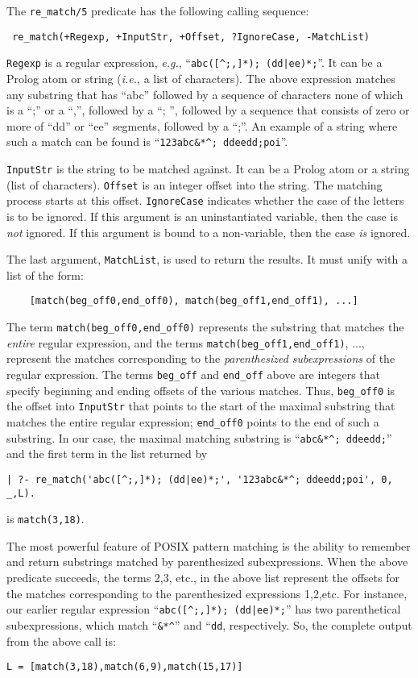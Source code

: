 The \verb|re_match/5| predicate has the following calling sequence:
\begin{verbatim}
 re_match(+Regexp, +InputStr, +Offset, ?IgnoreCase, -MatchList)
\end{verbatim}
{\tt Regexp} is a regular expression, {\it e.g.},
``\verb/abc([^;,]*); (dd|ee)*;/''. It can be a Prolog atom or string ({\it i.e.}, a list of
characters). The above expression matches any substring that has ``abc''
followed by a sequence of characters none of which is a ``;'' or a ``,'',
followed by a ``; '', followed by a sequence that consists of zero or more
of ``dd'' or ``ee'' segments, followed by a ``;''. An example of a string
where such a match can be found is ``\verb|123abc&*^; ddeedd;poi|''.

{\tt InputStr} is the string to be matched against. It can be a Prolog atom
or a string (list of characters). {\tt Offset} is an integer offset into
the string. The matching process starts at this offset. {\tt IgnoreCase}
indicates whether the case of the letters is to be ignored. If this
argument is an uninstantiated variable, then the case is \emph{not}
ignored. If this argument is bound to a non-variable, then the case
\emph{is} ignored.

The last argument, {\tt MatchList}, is used to return the results. It
must unify with a list of the form:
\begin{verbatim}
    [match(beg_off0,end_off0), match(beg_off1,end_off1), ...]  
\end{verbatim}
The term \verb|match(beg_off0,end_off0)| represents the substring
that matches the \emph{entire} regular expression,
and the terms \verb|match(beg_off1,end_off1)|, ..., represent the matches
corresponding to the {\em parenthesized subexpressions\/} of the regular
expression.
The terms {\tt beg\_off} and {\tt end\_off} above are integers that specify
beginning and ending offsets of the various matches. Thus, {\tt beg\_off0}
is the offset into {\tt InputStr} that points to the start of the maximal
substring that matches the entire regular expression; {\tt end\_off0} points to the
end of such a substring. In our case, the maximal matching substring is 
``\verb|abc&*^; ddeedd;|'' and the first term in the list returned by
\begin{verbatim}
| ?- re_match('abc([^;,]*); (dd|ee)*;', '123abc&*^; ddeedd;poi', 0, _,L).  
\end{verbatim}
is {\tt match(3,18)}.

The most powerful feature of POSIX pattern matching is the ability to
remember and return substrings matched by parenthesized subexpressions.
When the above predicate succeeds, the terms 2,3, etc., in the above list
represent the offsets for the matches corresponding to the parenthesized
expressions 1,2,etc.
For instance, our earlier regular expression 
  ``\verb/abc([^;,]*); (dd|ee)*;/'' has two parenthetical subexpressions, which
match ``\verb|&*^|'' and ``{\tt dd}, respectively. So, the complete output
from the above call is:
\begin{verbatim}
L = [match(3,18),match(6,9),match(15,17)]  
\end{verbatim}

